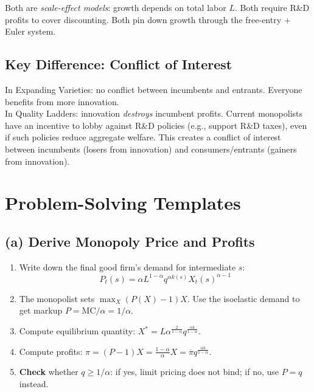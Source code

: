 \documentclass[a4paper,11pt]{article}
\newcommand{\pibar}{\overline{\pi}}
\begin{document}
Both are \emph{scale-effect models}: growth depends on total labor $L$. Both require R\&D profits to cover discounting. Both pin down growth through the free-entry + Euler system.

\subsection*{Key Difference: Conflict of Interest}

\begin{tcolorbox}[colback=orange!10,colframe=orange3,title=The Political Economy Difference]
In Expanding Varieties: no conflict between incumbents and entrants. Everyone benefits from more innovation.\\[0.5em]
In Quality Ladders: innovation \emph{destroys} incumbent profits. Current monopolists have an incentive to lobby against R\&D policies (e.g., support R\&D taxes), even if such policies reduce aggregate welfare. This creates a conflict of interest between incumbents (losers from innovation) and consumers/entrants (gainers from innovation).
\end{tcolorbox}

\clearpage

\section{Problem-Solving Templates}

\subsection*{(a) Derive Monopoly Price and Profits}

\begin{enumerate}
    \item Write down the final good firm's demand for intermediate $s$:
    \[
    P_t(s) = \alpha L^{1-\alpha} q^{\alpha k(s)} X_t(s)^{\alpha-1}
    \]
    \item The monopolist sets $\max_{X} (P(X)-1) X$. Use the isoelastic demand to get markup $P = \text{MC}/\alpha = 1/\alpha$.
    \item Compute equilibrium quantity: $X^* = L\alpha^{\frac{2}{1-\alpha}} q^{\frac{\alpha k}{1-\alpha}}$.
    \item Compute profits: $\pi = (P-1)X = \frac{1-\alpha}{\alpha} X = \pibar q^{\frac{\alpha k}{1-\alpha}}$.
    \item \textbf{Check} whether $q \geq 1/\alpha$: if yes, limit pricing does not bind; if no, use $P = q$ instead.
\end{enumerate}
\end{document}
